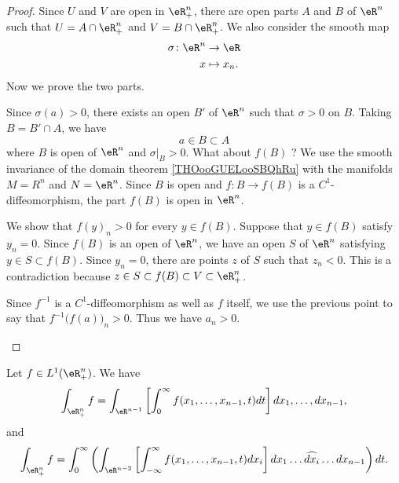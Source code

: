 \begin{proof}
	Since \( U\) and \( V\) are open in \( \eR^n_+\), there are open parts \( A\) and \( B\) of \( \eR^n\) such that \( U=A\cap \eR^n_+\) and \( V=B\cap \eR^n_+\). We also consider the smooth map
	\begin{equation}
		\begin{aligned}
			\sigma\colon \eR^n & \to \eR      \\
			x                  & \mapsto x_n.
		\end{aligned}
	\end{equation}
	Now we prove the two  parts.
	\begin{subproof}
		\spitem[Suppose \( a_n>0\)]
		Since \( \sigma(a)>0\), there exists an open \( B'\) of \( \eR^n\) such that \( \sigma>0\) on \( B\). Taking \( B=B'\cap A\), we have
		\begin{equation}
			a\in B\subset A
		\end{equation}
		where \( B\) is open of \( \eR^n\) and \( \sigma|_B>0\). What about \( f(B)\) ? We use the smooth invariance of the domain theorem \ref{THOooGUELooSBQhRu} with the manifolds \( M=R^n\) and \( N=\eR^n\). Since \( B\) is open and \(f \colon B\to f(B)  \) is a \( C^1\)-diffeomorphism, the part \( f(B)\) is open in \( \eR^n\).

		We show that \( f(y)_n>0\) for every \( y\in f(B)\). Suppose that \( y\in f(B)\) satisfy \( y_n=0\). Since \( f(B)\) is an open of \( \eR^n\), we have an open \( S\) of \( \eR^n\) satisfying \( y\in S\subset f(B)\). Since \( y_n=0\), there are points \( z\) of \( S\) such that \( z_n<0\). This is a contradiction because \( z\in S\subset f(B)\subset V\subset \eR^n_+\).

		\spitem[Suppose \( f(a)_n>0\)]
		Since \( f^{-1}\) is a \( C^1\)-diffeomorphism as well as \( f\) itself, we use the previous point to say that \( f^{-1}\big( f(a) \big)_n>0\). Thus we have \( a_n>0\).
	\end{subproof}
\end{proof}


\begin{lemma}	\label{LEMooYWBHooDTjCyf}
	Let \( f\in L^1(\eR^n_+)\). We have
	\begin{equation}		\label{EQooIYXTooJZpqhl}
		\int_{\eR^n_+}f=\int_{\eR^{n-1}}\left[  \int_0^{\infty}f(x_1,\ldots,x_{n-1},t)dt \right]dx_1,\ldots,dx_{n-1},
	\end{equation}
	and
	\begin{equation}		\label{EQooSNGAooTSrOKX}
		\int_{\eR^n_+}f=\int_0^{\infty}\left(    \int_{\eR^{n-2}} \left[  \int_{-\infty}^{\infty}f(x_1,\ldots,x_{n-1}, t)dx_i \right]dx_1\ldots \widehat{dx_i}\ldots dx_{n-1}   \right)dt.
	\end{equation}
\end{lemma}


